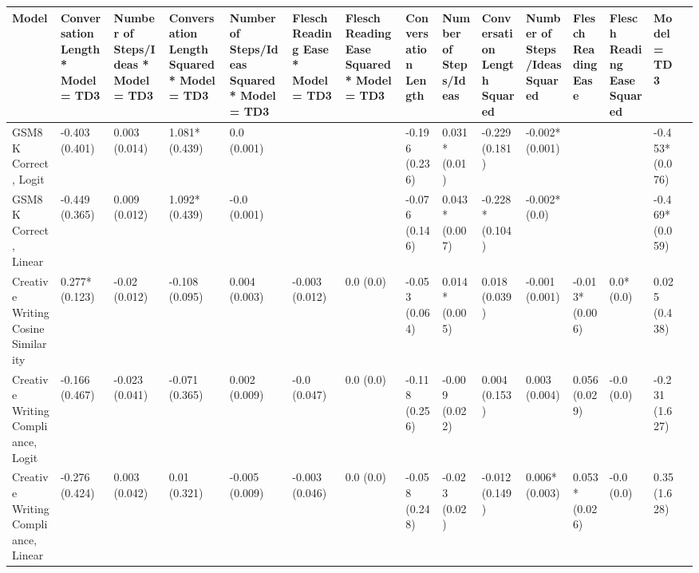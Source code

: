 \begin{tabular}{x{1.5cm}|x{0.75cm}|x{0.75cm}|x{0.75cm}|x{0.75cm}|x{0.75cm}|x{0.75cm}|x{0.75cm}|x{0.75cm}|x{0.75cm}|x{0.75cm}|x{0.75cm}|x{0.75cm}|x{0.75cm}|x{0.75cm}}
\toprule
\hline
Model & Conversation Length * Model = TD3 & Number of Steps/Ideas * Model = TD3 & Conversation Length Squared * Model = TD3 & Number of Steps/Ideas Squared * Model = TD3 & Flesch Reading Ease * Model = TD3 & Flesch Reading Ease Squared * Model = TD3 & Conversation Length & Number of Steps/Ideas & Conversation Length Squared & Number of Steps/Ideas Squared & Flesch Reading Ease & Flesch Reading Ease Squared & Model = TD3 \\
\hline
\midrule
GSM8K Correct, Logit & -0.403 (0.401) & 0.003 (0.014) & 1.081* (0.439) & 0.0 (0.001) &  &  & -0.196 (0.236) & 0.031* (0.01) & -0.229 (0.181) & -0.002* (0.001) &  &  & -0.453* (0.076) \\
\hline
GSM8K Correct, Linear & -0.449 (0.365) & 0.009 (0.012) & 1.092* (0.439) & -0.0 (0.001) &  &  & -0.076 (0.146) & 0.043* (0.007) & -0.228* (0.104) & -0.002* (0.0) &  &  & -0.469* (0.059) \\
\hline
Creative Writing Cosine Similarity & 0.277* (0.123) & -0.02 (0.012) & -0.108 (0.095) & 0.004 (0.003) & -0.003 (0.012) & 0.0 (0.0) & -0.053 (0.064) & 0.014* (0.005) & 0.018 (0.039) & -0.001 (0.001) & -0.013* (0.006) & 0.0* (0.0) & 0.025 (0.438) \\
\hline
Creative Writing Compliance, Logit & -0.166 (0.467) & -0.023 (0.041) & -0.071 (0.365) & 0.002 (0.009) & -0.0 (0.047) & 0.0 (0.0) & -0.118 (0.256) & -0.009 (0.022) & 0.004 (0.153) & 0.003 (0.004) & 0.056 (0.029) & -0.0 (0.0) & -0.231 (1.627) \\
\hline
Creative Writing Compliance, Linear & -0.276 (0.424) & 0.003 (0.042) & 0.01 (0.321) & -0.005 (0.009) & -0.003 (0.046) & 0.0 (0.0) & -0.058 (0.248) & -0.023 (0.02) & -0.012 (0.149) & 0.006* (0.003) & 0.053* (0.026) & -0.0 (0.0) & 0.35 (1.628) \\
\hline
\bottomrule
\end{tabular}
